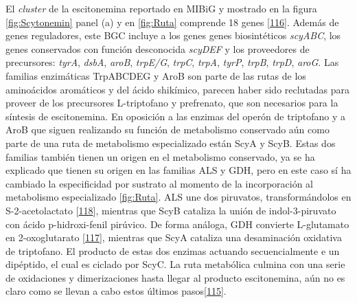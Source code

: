 \documentclass[12pt,twoside]{reedthesis}
\begin{document}
  El \emph{cluster} de la escitonemina reportado en MIBiG y mostrado en la
  figura \autoref{fig:Scytonemin} panel (a) y en \autoref{fig:Ruta}
  comprende 18 genes
  {[}\protect\hyperlink{ref-soule_comparative_2009}{116}{]}. Además de
  genes reguladores, este BGC incluye a los genes genes biosintéticos
  \emph{scyABC}, los genes conservados con función desconocida
  \emph{scyDEF} y los proveedores de precursores: \emph{tyrA},
  \emph{dsbA}, \emph{aroB}, \emph{trpE/G}, \emph{trpC}, \emph{trpA},
  \emph{tyrP}, \emph{trpB}, \emph{trpD}, \emph{aroG}. Las familias
  enzimáticas TrpABCDEG y AroB son parte de las rutas de los aminoácidos
  aromáticos y del ácido shikímico, parecen haber sido reclutadas para
  proveer de los precursores L-triptofano y prefrenato, que son necesarios
  para la síntesis de escitonemina. En oposición a las enzimas del operón
  de triptofano y a AroB que siguen realizando su función de metabolismo
  conservado aún como parte de una ruta de metabolismo especializado están
  ScyA y ScyB. Estas dos familias también tienen un origen en el
  metabolismo conservado, ya se ha explicado que tienen su origen en las
  familias ALS y GDH, pero en este caso sí ha cambiado la especificidad
  por sustrato al momento de la incorporación al metabolismo especializado
  \autoref{fig:Ruta}. ALS une dos piruvatos, transformándolos en
  S-2-acetolactato
  {[}\protect\hyperlink{ref-liu_acetohydroxyacid_2016}{118}{]}, mientras
  que ScyB cataliza la unión de indol-3-piruvato con ácido p-hidroxi-fenil
  pirúvico. De forma análoga, GDH convierte L-glutamato en 2-oxoglutarato
  {[}\protect\hyperlink{ref-engel_glutamate_2014}{117}{]}, mientras que
  ScyA cataliza una desaminación oxidativa de triptofano. El producto de
  estas dos enzimas actuando secuencialmente e un dipéptido, el cual es
  ciclado por ScyC. La ruta metabólica culmina con una serie de
  oxidaciones y dimerizaciones hasta llegar al producto escitonemina, aún
  no es claro como se llevan a cabo estos últimos
  pasos{[}\protect\hyperlink{ref-balskus_investigating_2008}{115}{]}.
  
\end{document}
